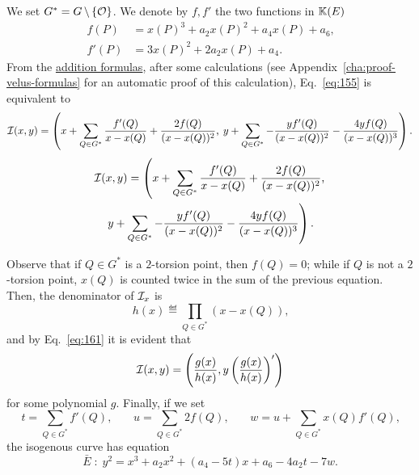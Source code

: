 We set $G^\ast=G\,\backslash\,\{\mathcal{O}\}$. We denote by $f,f'$ the two
functions in $\mathbb{K}(E)$
\begin{equation}
  \label{eq:162}
  \begin{aligned}
    f(P) &= x(P)^3 + a_2x(P)^2 + a_4x(P) + a_6
    \text{,}\\
    f'(P) &= 3x(P)^2 + 2a_2x(P) + a_4
    \text{.}
  \end{aligned}
\end{equation}
From the \hyperref[eq:121]{addition formulas}, after some calculations
(see Appendix~\ref{cha:proof-velus-formulas} for an automatic proof of
this calculation), Eq.~\eqref{eq:155} is equivalent to
\ifafourps
\begin{equation}
  \label{eq:161}
  \mathcal{I}(x,y) = \left(x + \sum_{Q\in G^\ast} \frac{f'(Q)}{x-x(Q)} + \frac{2f(Q)}{(x-x(Q))^2}\text{,}\right.
  \left.y + \sum_{Q\in G^\ast} -\frac{yf'(Q)}{(x-x(Q))^2} - \frac{4yf(Q)}{(x-x(Q))^3}\right)
  \text{.}
\end{equation}
\else
\begin{multline}
  \label{eq:161}
  \mathcal{I}(x,y) = \left(x + \sum_{Q\in G^\ast} \frac{f'(Q)}{x-x(Q)} + \frac{2f(Q)}{(x-x(Q))^2}\text{,}\right.\\
  \left.y + \sum_{Q\in G^\ast} -\frac{yf'(Q)}{(x-x(Q))^2} - \frac{4yf(Q)}{(x-x(Q))^3}\right)
  \text{.}
\end{multline}
\fi

Observe that if $Q\in G^\ast$ is a $2$-torsion point, then $f(Q)=0$;
while if $Q$ is not a $2$-torsion point, $x(Q)$ is counted twice in
the sum of the previous equation. Then, the denominator of $\mathcal{I}_x$ is
\begin{equation}
  \label{eq:158}
  h(x) \eqdef \prod_{Q\in G^\ast}(x - x(Q))
  \text{,}
\end{equation}
and by Eq.~\eqref{eq:161} it is evident that
\begin{equation}
  \label{eq:159}
  \mathcal{I}(x,y) = \left(\frac{g(x)}{h(x)}, y\left(\frac{g(x)}{h(x)}\right)'\right)
\end{equation}
for some polynomial $g$.  Finally, if we set 
\begin{equation}
  \label{eq:164}
  t = \sum_{Q\in G^\ast} f'(Q)\text{,}
  \qquad
  u = \sum_{Q\in G^\ast} 2f(Q)\text{,}
  \qquad
  w = u + \sum_{Q\in G^\ast} x(Q)f'(Q)\text{,}
\end{equation}
the isogenous curve has equation
\begin{equation}
  \label{eq:163}
  \bar{E}\;:\;y^2 = x^3 + a_2x^2 + (a_4-5t)x + a_6 - 4a_2t - 7w
  \text{.}
\end{equation}

